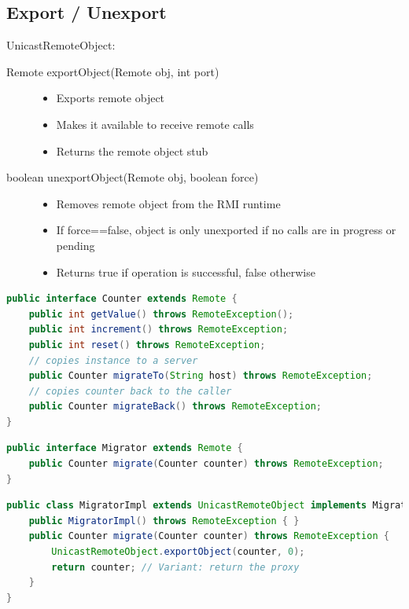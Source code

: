 \documentclass[10pt]{article}
\begin{document}
\subsection{Export / Unexport}
UnicastRemoteObject:
\begin{description}
	\item[Remote exportObject(Remote obj, int port)] \hfill
		\begin{itemize}
			\item Exports remote object
			\item Makes it available to receive remote calls
			\item Returns the remote object stub
		\end{itemize}
	\item[boolean unexportObject(Remote obj, boolean force)] \hfill
		\begin{itemize}
			\item Removes remote object from the RMI runtime
			\item If force==false, object is only unexported if no calls are in progress or pending
			\item Returns true if operation is successful, false otherwise
		\end{itemize}
\end{description}
\begin{lstlisting}[language=Java, caption=Example Interface, style=JavaStyle]
public interface Counter extends Remote {
	public int getValue() throws RemoteException(); 
	public int increment() throws RemoteException; 
	public int reset() throws RemoteException;
	// copies instance to a server 
	public Counter migrateTo(String host) throws RemoteException; 
	// copies counter back to the caller
	public Counter migrateBack() throws RemoteException; 
}
\end{lstlisting}
\begin{lstlisting}[language=Java, caption=Migrator interface, style=JavaStyle]
public interface Migrator extends Remote {
	public Counter migrate(Counter counter) throws RemoteException;
}
\end{lstlisting}
\begin{lstlisting}[language=Java, caption=Migrator implementation, style=JavaStyle]
public class MigratorImpl extends UnicastRemoteObject implements Migrator {
	public MigratorImpl() throws RemoteException { }
	public Counter migrate(Counter counter) throws RemoteException {
		UnicastRemoteObject.exportObject(counter, 0);
		return counter; // Variant: return the proxy
	}
}
\end{lstlisting}
\end{document}
